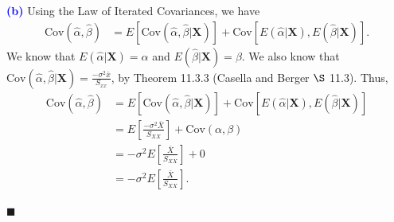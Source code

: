 \documentclass[12pt]{article}
\begin{document}
\vspace{3mm}

\noindent \textcolor{blue}{\textbf{(b)}} Using the Law of Iterated Covariances, we have
\begin{align}
\text{Cov}\left(\hat{\alpha}, \hat{\beta}\right) &= E\left[\text{Cov}\left(\hat{\alpha}, \hat{\beta}|\textbf{X}\right)\right] + \text{Cov}\left[E\left(\hat{\alpha}|\textbf{X}\right), E\left(\hat{\beta}|\textbf{X}\right)\right].
\end{align}
We know that $E\left(\hat{\alpha}| \textbf{X}\right) = \alpha$ and $E\left(\hat{\beta}|\textbf{X}\right) = \beta$. We also know that $\text{Cov}\left(\hat{\alpha}, \hat{\beta} |\textbf{X}\right) = \frac{-\sigma^2\bar{x}}{S_{xx}}$, by Theorem 11.3.3 (Casella and Berger $\S$ 11.3). Thus,
\begin{align}
\text{Cov}\left(\hat{\alpha}, \hat{\beta}\right) &= E\left[\text{Cov}\left(\hat{\alpha}, \hat{\beta}|\textbf{X}\right)\right] + \text{Cov}\left[E\left(\hat{\alpha}|\textbf{X}\right), E\left(\hat{\beta}|\textbf{X}\right)\right] \\
&= E\left[\frac{-\sigma^2\bar{X}}{S_{XX}}\right] + \text{Cov}\left(\alpha, \beta\right) \\
&= -\sigma^2E\left[\frac{\bar{X}}{S_{XX}}\right] + 0 \\
&= -\sigma^2E\left[\frac{\bar{X}}{S_{XX}}\right].  
\end{align}

\hfill$\blacksquare$

\vfill
\begin{center}
\end{center}
\begin{center}
\vspace{-0.6cm}
\hrulefill \\
\vspace{-0.7cm}
\hrulefill
\end{center}
\end{document}
